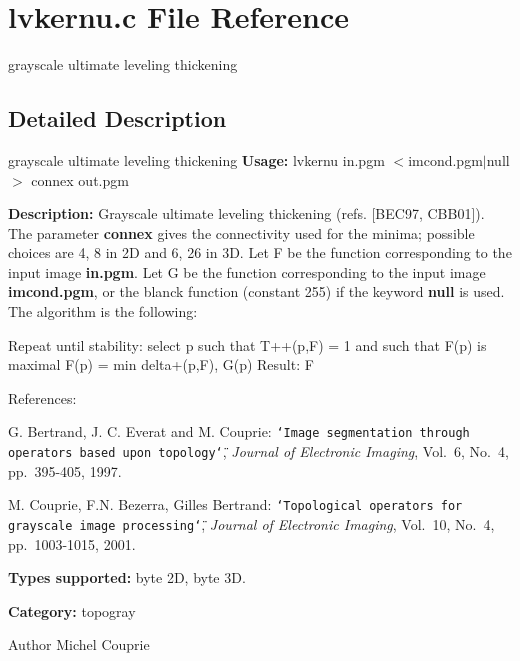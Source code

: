 \section{lvkernu.c File Reference}
\label{lvkernu_8c}


grayscale ultimate leveling thickening  




\subsection{Detailed Description}
grayscale ultimate leveling thickening {\bfseries Usage:} lvkernu in.pgm $<$imcond.pgm$|$null$>$ connex out.pgm

{\bfseries Description:} Grayscale ultimate leveling thickening (refs. [BEC97, CBB01]). The parameter {\bfseries connex} gives the connectivity used for the minima; possible choices are 4, 8 in 2D and 6, 26 in 3D. Let F be the function corresponding to the input image {\bfseries in.pgm}. Let G be the function corresponding to the input image {\bfseries imcond.pgm}, or the blanck function (constant 255) if the keyword {\bfseries null} is used. The algorithm is the following:

\begin{DoxyVerb}
Repeat until stability:
    select p such that T++(p,F) = 1 and such that F(p) is maximal
    F(p) = min{ delta+(p,F), G(p) }    
Result: F
\end{DoxyVerb}


References:\par
 [BEC97] G. Bertrand, J. C. Everat and M. Couprie: {\tt \char`\"{}Image segmentation through operators based upon topology\char`\"{}}, {\itshape  Journal of Electronic Imaging\/}, Vol.~6, No.~4, pp.~395-\/405, 1997.\par
 [CBB01] M. Couprie, F.N. Bezerra, Gilles Bertrand: {\tt \char`\"{}Topological operators for
grayscale image processing\char`\"{}}, {\itshape  Journal of Electronic Imaging\/}, Vol.~10, No.~4, pp.~1003-\/1015, 2001.

{\bfseries Types supported:} byte 2D, byte 3D.

{\bfseries Category:} topogray

\begin{DoxyAuthor}{Author}
Michel Couprie 
\end{DoxyAuthor}
